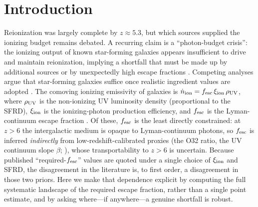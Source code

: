 \documentclass[twocolumn]{aastex631}
\begin{document}
\section{Introduction}
Reionization was largely complete by $z\approx5.3$, but which sources supplied the ionizing budget remains debated. A recurring claim is a ``photon-budget crisis'': the ionizing output of known star-forming galaxies appears insufficient to drive and maintain reionization, implying a shortfall that must be made up by additional sources or by unexpectedly high escape fractions \citep{Munoz2024,Davies2021}. Competing analyses argue that star-forming galaxies suffice once realistic ingredient values are adopted \citep{Duncan2015,Madau2017}. The comoving ionizing emissivity of galaxies is $\dot{n}_{\rm ion}=f_{\rm esc}\,\xi_{\rm ion}\,\rho_{\rm UV}$, where $\rho_{\rm UV}$ is the non-ionizing UV luminosity density (proportional to the SFRD), $\xi_{\rm ion}$ is the ionizing-photon production efficiency, and $f_{\rm esc}$ is the Lyman-continuum escape fraction \citep{Robertson2015}. Of these, $f_{\rm esc}$ is the least directly constrained: at $z>6$ the intergalactic medium is opaque to Lyman-continuum photons, so $f_{\rm esc}$ is inferred \emph{indirectly} from low-redshift-calibrated proxies (the O32 ratio, the UV continuum slope $\beta$; \citealt{Chisholm2022,Flury2022}), whose transportability to $z>6$ is uncertain. Because published ``required-$f_{\rm esc}$'' values are quoted under a single choice of $\xi_{\rm ion}$ and SFRD, the disagreement in the literature is, to first order, a disagreement in those two priors. Here we make that dependence explicit by computing the full systematic landscape of the required escape fraction, rather than a single point estimate, and by asking where---if anywhere---a genuine shortfall is robust.
\end{document}
